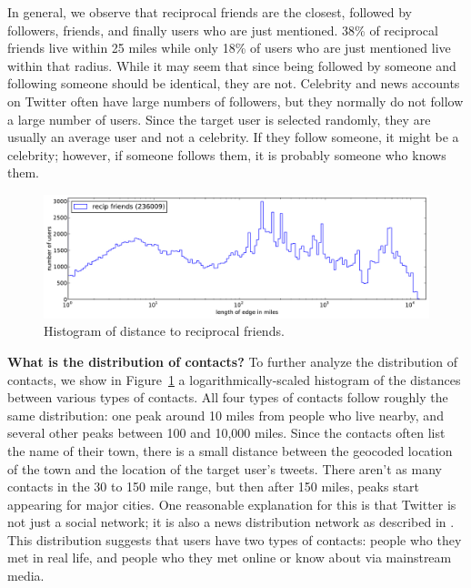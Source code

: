 \documentclass{sig-alternate}
\begin{document}
In general, we observe that reciprocal friends are the closest, followed by followers, friends,
and finally users who are just mentioned.
%
38\% of reciprocal friends live within 25 miles while only 18\% of users
who are just mentioned live within that radius.
%
While it may seem that since being followed by someone and following someone
should be identical, they are not.
%
Celebrity and news accounts on Twitter often have large numbers of followers,
but they normally do not follow a large number of users.
%
Since the target user is selected randomly, they are usually an average
user and not a celebrity.
%
If they follow someone, it might be a celebrity; however, if someone follows
them, it is probably someone who knows them.

\begin{figure}[tb]
\centering
\includegraphics[width=.9\linewidth]{figures/rfrd_norm.pdf}
\caption{
Histogram of distance to reciprocal friends.
}
\label{fig:RfrdNorm}
\vspace{-2pt}
\end{figure}


\noindent\textbf{What is the distribution of contacts?}
To further analyze the distribution of contacts, we show in
Figure~\ref{fig:RfrdNorm} a logarithmically-scaled
histogram of the distances between various types of contacts.
%
All four types of contacts follow roughly the same
distribution: one peak around 10 miles from people who live nearby, and several
other peaks between 100 and 10,000 miles.
%
Since the contacts often list the name of their town, there is a small distance
between the geocoded location of the town and the location of the target
user's tweets.
%
There aren't as many contacts in the 30 to 150 mile range, but then after 150
miles, peaks start appearing for major cities.
%
One reasonable explanation for this is that Twitter is not just a social
network; it is also a news distribution network as described in
\cite{kwak2010why}.
%
This distribution suggests that users have two types of contacts: people who
they met in real life, and people who they met online or know about via
mainstream media.
\end{document}
